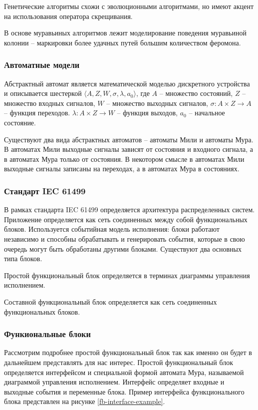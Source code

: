 \documentclass[14pt]{extarticle}
\theoremstyle{plain}
\theoremstyle{definition}
\begin{document}
Генетические алгоритмы схожи с эволюционными алгоритмами, но имеют акцент на
использования оператора скрещивания.

В основе муравьиных алгоритмов лежит моделирование поведения муравьиной колонии
-- маркировки более удачных путей большим количеством феромона.

\subsubsection{Автоматные модели}

Абстрактный автомат является математической моделью дискретного устройства
и описывается шестеркой $\langle A, Z, W, \sigma, \lambda, a_0 \rangle$,
где $A$ -- множество состояний, $Z$ -- множество входных сигналов,
$W$ -- множество выходных сигналов, $\sigma : A \times Z \rightarrow A$ --
функция переходов. $\lambda : A \times Z \rightarrow W$ -- функция выходов,
$a_0$  -- начальное состояние.

Существуют два вида абстрактных автоматов -- автоматы Мили и автоматы Мура.
В автоматах Мили выходные сигналы зависят от состояния и входного сигнала,
а в автоматах Мура только от состояния. В некотором смысле в автоматах Мили
выходные сигналы записаны на переходах, а в автоматах Мура в состояниях.

\subsubsection{Стандарт IEC 61499}

В рамках стандарта IEC 61499 определяется архитектура распределенных систем.
Приложение определяется как сеть соединенных между собой функциональных блоков.
Используется событийная модель исполнения: блоки работают независимо и способны
обрабатывать и генерировать события, которые в свою очередь могут быть обработаны
другими блоками. Существуют два основных типа блоков.

Простой функциональный блок определяется в терминах диаграммы управления исполнением.

Составной функциональный блок определяется как сеть соединенных функциональных блоков.

\subsubsection{Функиональные блоки}

Рассмотрим подробнее простой функциональный блок так как именно он будет в
дальнейшем представлять для нас интерес.
Простой функциональный блок определяется интерфейсом и специальной формой
автомата Мура, называемой диаграммой управления исполнением. Интерфейс
определяет входные и выходные события и переменные блока. Пример интерфейса
функционального блока представлен на рисунке \ref{fb-interface-example}.
\end{document}
